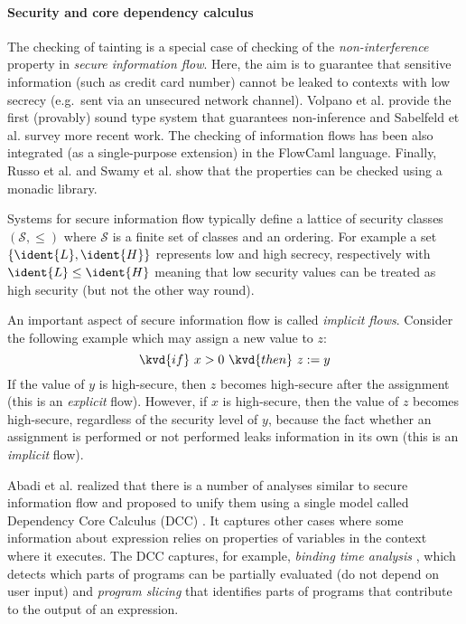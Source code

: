 
\paragraph{Security and core dependency calculus}

The checking of tainting is a special case of checking of the \emph{non-interference} property 
in \emph{secure information flow}. Here, the aim is to guarantee that sensitive information (such
as credit card number) cannot be leaked to contexts with low secrecy (e.g.~sent via an unsecured
network channel). Volpano et al. \cite{app-secure-flow} provide the first (provably) sound type 
system that guarantees non-inference and Sabelfeld et al. \cite{app-secure-information-flow} survey
more recent work. The checking of information flows has been also integrated (as a single-purpose
extension) in the FlowCaml \cite{app-security-flowcaml} language. Finally, Russo et al. and 
Swamy et al. \cite{monad-secure-flow,monads-lightweight-ml} show that the properties can be checked
using a monadic library.

Systems for secure information flow typically define a lattice of security classes $(\mathcal{S}, \leq)$
where $\mathcal{S}$ is a finite set of classes and an ordering. For example a set $\{\ident{L}, \ident{H}\}$ 
represents low and high secrecy, respectively with $\ident{L} \leq \ident{H}$ meaning that low security
values can be treated as high security (but not the other way round).

An important aspect of secure information flow is called \emph{implicit flows}. Consider the following
example which may assign a new value to $z$:
%
\begin{equation*}
\kvd{if}~x>0~\kvd{then}~z := y
\end{equation*}
%
If the value of $y$ is high-secure, then $z$ becomes high-secure after the assignment
(this is an \emph{explicit} flow). However, if $x$ is high-secure, then the value of
$z$ becomes high-secure, regardless of the security level of $y$, because the fact whether an 
assignment is performed or not performed leaks information in its own (this is an 
\emph{implicit} flow).

Abadi et al. realized that there is a number of analyses similar to secure information flow
and proposed to unify them using a single model called Dependency Core Calculus (DCC) \cite{app-dcc}.
It captures other cases where some information about expression relies on properties of variables
in the context where it executes.  The DCC captures, for example, \emph{binding time analysis}
\cite{app-binding-time-analysis}, which detects which parts of programs can be partially evaluated
(do not depend on user input) and \emph{program slicing} \cite{app-slicing-survey} that identifies
parts of programs that contribute to the output of an expression.
	
